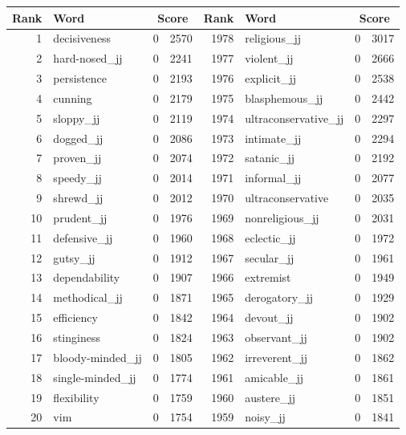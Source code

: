 \begin{table}[tbp]
    \begin{tabular}{| rlr@{.}l | rlr@{.}l |}
    \hline
    \textbf{Rank} & \textbf{Word} & \multicolumn{2}{c|}{\textbf{Score}} & \textbf{Rank} & \textbf{Word} & \multicolumn{2}{c|}{\textbf{Score}} \\
    \hline
    1 & decisiveness & 0 & 2570    &    1978 & religious\_jj & 0 & 3017 \\
    2 & hard-nosed\_jj & 0 & 2241    &    1977 & violent\_jj & 0 & 2666 \\
    3 & persistence & 0 & 2193    &    1976 & explicit\_jj & 0 & 2538 \\
    4 & cunning & 0 & 2179    &    1975 & blasphemous\_jj & 0 & 2442 \\
    5 & sloppy\_jj & 0 & 2119    &    1974 & ultraconservative\_jj & 0 & 2297 \\
    6 & dogged\_jj & 0 & 2086    &    1973 & intimate\_jj & 0 & 2294 \\
    7 & proven\_jj & 0 & 2074    &    1972 & satanic\_jj & 0 & 2192 \\
    8 & speedy\_jj & 0 & 2014    &    1971 & informal\_jj & 0 & 2077 \\
    9 & shrewd\_jj & 0 & 2012    &    1970 & ultraconservative & 0 & 2035 \\
    10 & prudent\_jj & 0 & 1976    &    1969 & nonreligious\_jj & 0 & 2031 \\
    11 & defensive\_jj & 0 & 1960    &    1968 & eclectic\_jj & 0 & 1972 \\
    12 & gutsy\_jj & 0 & 1912    &    1967 & secular\_jj & 0 & 1961 \\
    13 & dependability & 0 & 1907    &    1966 & extremist & 0 & 1949 \\
    14 & methodical\_jj & 0 & 1871    &    1965 & derogatory\_jj & 0 & 1929 \\
    15 & efficiency & 0 & 1842    &    1964 & devout\_jj & 0 & 1902 \\
    16 & stinginess & 0 & 1824    &    1963 & observant\_jj & 0 & 1902 \\
    17 & bloody-minded\_jj & 0 & 1805    &    1962 & irreverent\_jj & 0 & 1862 \\
    18 & single-minded\_jj & 0 & 1774    &    1961 & amicable\_jj & 0 & 1861 \\
    19 & flexibility & 0 & 1759    &    1960 & austere\_jj & 0 & 1851 \\
    20 & vim & 0 & 1754    &    1959 & noisy\_jj & 0 & 1841 \\

\end{tabular}
\end{table}
